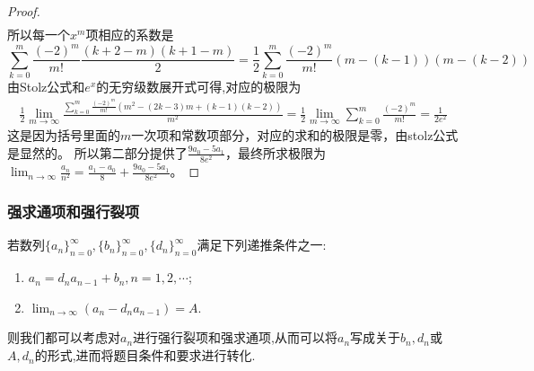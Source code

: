\documentclass[../../main.tex]{subfiles}%
\begin{document}
\begin{proof}
\begin{align*}
\end{align*}
所以每一个\(x^m\)项相应的系数是
\[
\sum_{k = 0}^{m}\frac{(-2)^m}{m!}\frac{(k + 2 - m)(k + 1 - m)}{2}=\frac{1}{2}\sum_{k = 0}^{m}\frac{(-2)^m}{m!}(m - (k - 1))(m - (k - 2))
\]
由Stolz公式和$e^x$的无穷级数展开式可得,对应的极限为
\begin{align*}
\frac{1}{2}\lim_{m\rightarrow\infty}\frac{\sum\limits_{k = 0}^{m}\frac{(-2)^m}{m!}(m^2-(2k - 3)m+(k - 1)(k - 2))}{m^2}
=\frac{1}{2}\lim_{m\rightarrow\infty}\sum_{k = 0}^{m}\frac{(-2)^m}{m!}=\frac{1}{2e^2}
\end{align*}
这是因为括号里面的\(m\)一次项和常数项部分，对应的求和的极限是零，由stolz公式是显然的。
所以第二部分提供了\(\frac{9a_0 - 5a_1}{8e^2}\)，最终所求极限为\(\lim_{n\rightarrow\infty}\frac{a_n}{n^2}=\frac{a_1 - a_0}{8}+\frac{9a_0 - 5a_1}{8e^2}\)。
\end{proof}





\subsubsection{强求通项和强行裂项}

若数列\(\{ a_n \}_{n = 0}^{\infty}, \{ b_n \}_{n = 0}^{\infty}, \{ d_n \}_{n = 0}^{\infty}\)满足下列递推条件之一:
\begin{enumerate}
\item \(a_n = d_na_{n - 1} + b_n, n = 1, 2, \cdots\);
\item \(\lim_{n\rightarrow \infty}(a_n - d_na_{n - 1}) = A\).
\end{enumerate}
则我们都可以考虑对\(a_n\)进行强行裂项和强求通项,从而可以将\(a_n\)写成关于\(b_n, d_n\)或\(A, d_n\)的形式,进而将题目条件和要求进行转化.
\end{document}
